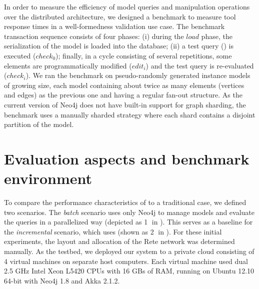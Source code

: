 \label{benchmark}
In order to measure the efficiency of model queries and manipulation operations over the distributed architecture, we designed a benchmark to measure tool response times in a well-formedness validation use case. The benchmark transaction sequence consists of four phases: (i) during the $\mathit{load}$ phase, the serialization of the model is loaded into the database; (ii) a test query () is executed ($\mathit{check}_0$); finally, in a cycle consisting of several repetitions, some elements are programmatically modified ($\mathit{edit}_i$) and the test query is re-evaluated ($\mathit{check}_i$). We ran the benchmark on pseudo-randomly generated instance models of growing size, each model containing about twice as many elements (vertices and edges) as the previous one and having a regular fan-out structure. As the current version of Neo4j does not have built-in support for graph sharding, the benchmark uses a manually sharded strategy where each shard contains a disjoint partition of the model.






\label{benchmark_environment}
\section{Evaluation aspects and benchmark environment}

To compare the performance characteristics of \iqd{} to a traditional case, we defined two scenarios. The \textit{batch} scenario uses only Neo4j to manage models and evaluate the queries in a parallelized way (depicted as \textcircled{1} in ). This serves as a baseline for the \textit{incremental} scenario, which uses \iqd{} (shown as \textcircled{2} in ). For these initial experiments, the layout and allocation of the Rete network was determined manually. As the testbed, we deployed our system to a private cloud consisting of 4 virtual machines on separate host computers. Each virtual machine used dual 2.5 GHz Intel Xeon L5420 CPUs with 16 GBs of RAM, running on Ubuntu 12.10 64-bit with Neo4j 1.8 and Akka 2.1.2.


